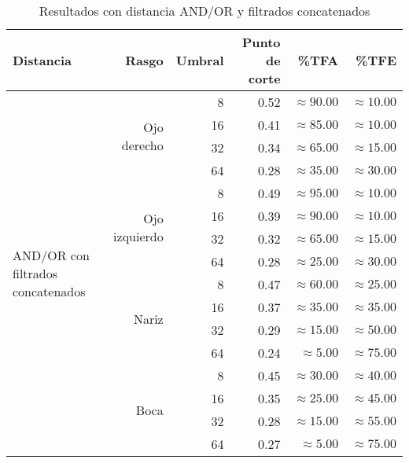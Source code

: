 \begin{table}
\begin{tabular}{|l|r|r|r|r|r|}
 \hline
  Distancia & Rasgo & Umbral & Punto de corte & \%TFA  & \%TFE \\
  \hline \hline
  \multirow{16}{*}{AND/OR con filtrados concatenados }
& \multirow{4}{*}{Ojo derecho} & 8  & 0.52 & $\approx 90.00$ & $\approx 10.00$ \\
& & 16 & 0.41 & $\approx 85.00$ & $\approx 10.00$ \\
& & 32 & 0.34 & $\approx 65.00$ & $\approx 15.00$ \\
& & 64 & 0.28 & $\approx 35.00$ & $\approx 30.00$ \\ \cline{2-6}

& \multirow{4}{*}{Ojo izquierdo} & 8  & 0.49 & $\approx 95.00$ & $\approx 10.00$ \\
& & 16 & 0.39 & $\approx 90.00$ & $\approx 10.00$ \\
& & 32 & 0.32 & $\approx 65.00$ & $\approx 15.00$ \\
& & 64 & 0.28 & $\approx 25.00$ & $\approx 30.00$ \\ \cline{2-6}

& \multirow{4}{*}{Nariz} & 8  & 0.47 & $\approx 60.00$ & $\approx 25.00$ \\
& & 16 & 0.37 & $\approx 35.00$ & $\approx 35.00$ \\
& & 32 & 0.29 & $\approx 15.00$ & $\approx 50.00$ \\
& & 64 & 0.24 & $\approx 5.00$ & $\approx 75.00$ \\ \cline{2-6}

& \multirow{4}{*}{Boca} & 8  & 0.45 & $\approx 30.00$ & $\approx 40.00$ \\
& & 16 & 0.35 & $\approx 25.00$ & $\approx 45.00$ \\
& & 32 & 0.28 & $\approx 15.00$ & $\approx 55.00$ \\
& & 64 & 0.27 & $\approx 5.00$ & $\approx 75.00$ \\ \hline

 \end{tabular}
 \caption{Resultados con distancia AND/OR y filtrados concatenados}
 \label{tab:and_con}
\end{table}
